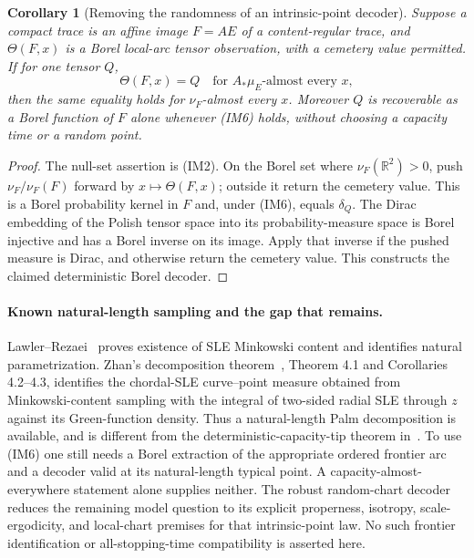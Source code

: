 \documentclass[11pt]{article}
\newtheorem{corollary}[theorem]{Corollary}
\theoremstyle{definition}\newtheorem{definition}[theorem]{Definition}
\theoremstyle{remark}\newtheorem{remark}[theorem]{Remark}
\begin{document}
\begin{corollary}[Removing the randomness of an intrinsic-point decoder]
\label{cor:intrinsic-point-decoder}
Suppose a compact trace is an affine image $F=AE$ of a content-regular
trace, and $\Theta(F,x)$ is a Borel local-arc tensor observation, with a
cemetery value permitted. If for one tensor $Q$,
\[
 \Theta(F,x)=Q\quad\text{for }A_*\mu_E\text{-almost every }x,
 \tag{IM6}
\]
then the same equality holds for $\nu_F$-almost every $x$.
Moreover $Q$ is recoverable as a Borel function of $F$ alone whenever
(IM6) holds, without choosing a capacity time or a random point.
\end{corollary}
\begin{proof}
The null-set assertion is (IM2). On the Borel set where
$\nu_F(\mathbb R^2)>0$, push $\nu_F/\nu_F(F)$ forward by
$x\mapsto\Theta(F,x)$; outside it return the cemetery value. This is a Borel probability kernel in $F$ and,
under (IM6), equals $\delta_Q$. The Dirac embedding of the Polish tensor
space into its probability-measure space is Borel injective and has a
Borel inverse on its image. Apply that inverse if the pushed measure is
Dirac, and otherwise return the cemetery value. This constructs the
claimed deterministic Borel decoder.
\end{proof}

\paragraph{Known natural-length sampling and the gap that remains.}
Lawler--Rezaei~\cite{lawler-rezaei-content} proves existence of SLE
Minkowski content and identifies natural parametrization. Zhan's
decomposition theorem~\cite{zhan-natural-palm}, Theorem 4.1 and
Corollaries 4.2--4.3, identifies the chordal-SLE curve--point measure
obtained from Minkowski-content sampling with the integral of two-sided
radial SLE through $z$ against its Green-function density. Thus a
natural-length Palm decomposition is available, and is different from
the deterministic-capacity-tip theorem in~\cite{zhan-tip}.
To use (IM6) one still needs a Borel extraction of the appropriate
ordered frontier arc and a decoder valid at its natural-length typical
point. A capacity-almost-everywhere statement alone supplies neither.
The robust random-chart decoder reduces the remaining model question
to its explicit properness, isotropy, scale-ergodicity, and local-chart
premises for that intrinsic-point law. No such frontier identification
or all-stopping-time compatibility is asserted here.
\end{document}
